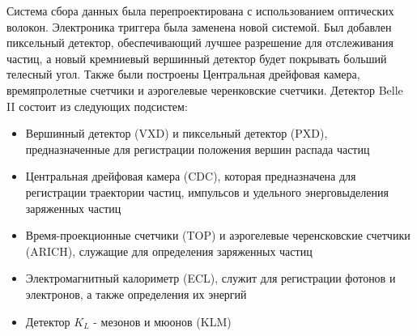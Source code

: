   Система сбора данных была перепроектирована с использованием оптических волокон. Электроника триггера была заменена новой системой. Был добавлен пиксельный детектор, обеспечивающий лучшее разрешение для отслеживания частиц, а новый кремниевый вершинный детектор будет покрывать больший телесный угол. Также были построены Центральная дрейфовая камера, времяпролетные счетчики и аэрогелевые черенковские счетчики. Детектор Belle II состоит из следующих подсистем:
\begin{itemize}
  \item Вершинный детектор (VXD) и пиксельный детектор (PXD), предназначенные для регистрации положения вершин распада частиц
  \item Центральная дрейфовая камера (CDC), которая предназначена для регистрации траектории частиц, импульсов и удельного энерговыделения заряженных частиц
  \item Время-проекционные счетчики (TOP) и аэрогелевые черенсковские счетчики (ARICH), служащие для определения заряженных частиц
  \item Электромагнитный калориметр (ECL), служит для регистрации фотонов и электронов, а также определения их энергий
  \item Детектор $K_{L}$ - мезонов и мюонов (KLM)
\end{itemize}
\par
 

